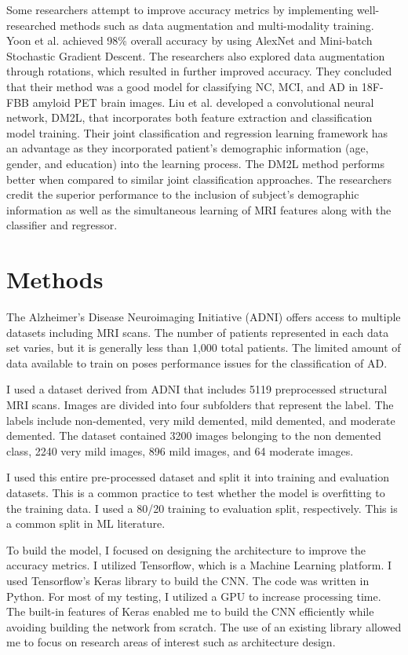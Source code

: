 \documentclass[10pt,twocolumn]{article}
\begin{document}
Some researchers attempt to improve accuracy metrics by implementing well-researched methods such as data augmentation and multi-modality training. Yoon et al. \cite{yoon2018classification} achieved 98\% overall accuracy by using AlexNet and Mini-batch Stochastic Gradient Descent. The researchers also explored data augmentation through rotations, which resulted in further improved accuracy. They concluded that their method was a good model for classifying NC, MCI, and AD in 18F-FBB amyloid PET brain images. Liu et al. \cite{liu2018joint} developed a convolutional neural network, DM2L, that incorporates both feature extraction and classification model training. Their joint classification and regression learning framework has an advantage as they incorporated patient's demographic information (age, gender, and education) into the learning process. The DM2L method performs better when compared to similar joint classification approaches. The researchers credit the superior performance to the inclusion of subject's demographic information as well as the simultaneous learning of MRI features along with the classifier and regressor.

\section{Methods}
The Alzheimer's Disease Neuroimaging Initiative (ADNI) offers access to multiple datasets including MRI scans. The number of patients represented in each data set varies, but it is generally less than 1,000 total patients. The limited amount of data available to train on poses performance issues for the classification of AD. 

I used a dataset derived from ADNI that includes 5119 preprocessed structural MRI scans. Images are divided into four subfolders that represent the label. The labels include non-demented, very mild demented, mild demented, and moderate demented. The dataset contained 3200 images belonging to the non demented class, 2240 very mild images, 896 mild images, and 64 moderate images. 

I used this entire pre-processed dataset and split it into training and evaluation datasets. This is a common practice to test whether the model is overfitting to the training data. I used a 80/20 training to evaluation split, respectively. This is a common split in ML literature. 

To build the model, I focused on designing the architecture to improve the accuracy metrics. I utilized Tensorflow, which is a Machine Learning platform. I used Tensorflow's Keras library to build the CNN. The code was written in Python. For most of my testing, I utilized a GPU to increase processing time. The built-in features of Keras enabled me to build the CNN efficiently while avoiding building the network from scratch. The use of an existing library allowed me to focus on research areas of interest such as architecture design. 
\end{document}
